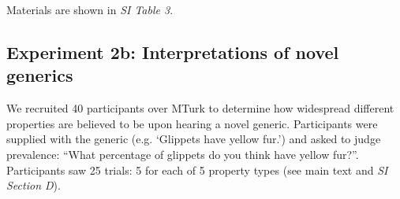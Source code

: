 \documentclass{pnastwo}
\begin{document}
\begin{article}
\begin{materials}
Materials are shown in {\it SI Table 3}.

\subsection{Experiment 2b: Interpretations of novel generics}
We recruited 40 participants over MTurk to determine how widespread different properties are believed to be upon hearing a novel generic.  
Participants were supplied with the generic (e.g. `Glippets have yellow fur.') and asked to judge prevalence: ``What percentage of glippets do you think have yellow fur?''. 
Participants saw 25 trials: 5 for each of 5 property types (see main text and {\it SI Section D}).

\end{materials}
\end{article}
\end{document}

